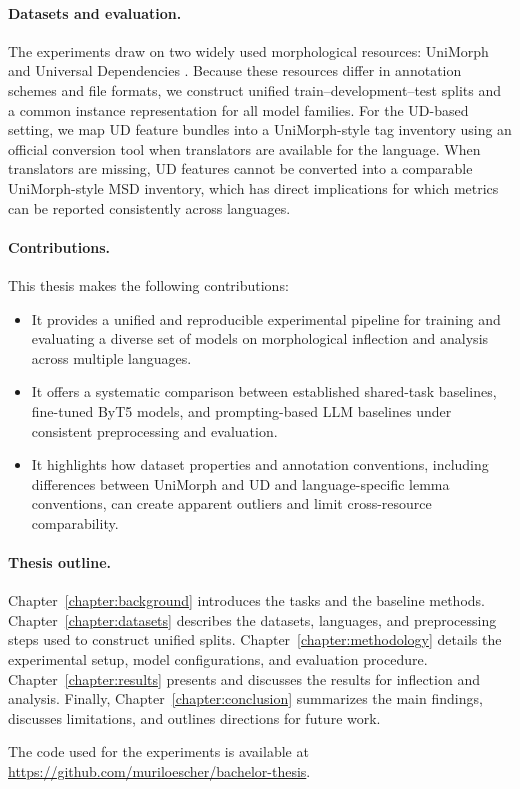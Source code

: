 \paragraph{Datasets and evaluation.}
The experiments draw on two widely used morphological resources: UniMorph \parencite{batsuren-etal-2022-unimorph} and Universal Dependencies \parencite{nivre-etal-2020-universal}. Because these resources differ in annotation schemes and file formats, we construct unified train--development--test splits and a common instance representation for all model families. For the \ac{UD}-based setting, we map \ac{UD} feature bundles into a UniMorph-style tag inventory using an official conversion tool \parencite{mccarthy-etal-2018-marrying} when translators are available for the language. When translators are missing, \ac{UD} features cannot be converted into a comparable UniMorph-style \ac{MSD} inventory, which has direct implications for which metrics can be reported consistently across languages.

\paragraph{Contributions.}
This thesis makes the following contributions:
\begin{itemize}
	\item It provides a unified and reproducible experimental pipeline for training and evaluating a diverse set of models on morphological inflection and analysis across multiple languages.
	\item It offers a systematic comparison between established shared-task baselines, fine-tuned ByT5 models, and prompting-based LLM baselines under consistent preprocessing and evaluation.
	\item It highlights how dataset properties and annotation conventions, including differences between UniMorph and \ac{UD} and language-specific lemma conventions, can create apparent outliers and limit cross-resource comparability.
\end{itemize}

\paragraph{Thesis outline.}
Chapter~\ref{chapter:background} introduces the tasks and the baseline methods. Chapter~\ref{chapter:datasets} describes the datasets, languages, and preprocessing steps used to construct unified splits. Chapter~\ref{chapter:methodology} details the experimental setup, model configurations, and evaluation procedure. Chapter~\ref{chapter:results} presents and discusses the results for inflection and analysis. Finally, Chapter~\ref{chapter:conclusion} summarizes the main findings, discusses limitations, and outlines directions for future work.

The code used for the experiments is available at \url{https://github.com/muriloescher/bachelor-thesis}.